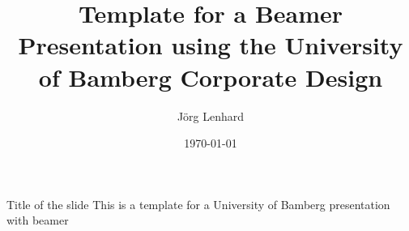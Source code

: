\documentclass{beamer}
\title[DSG Template]{Template for a Beamer Presentation using the University of Bamberg Corporate Design}
\author{J\"org Lenhard}
\institute{Distributed Systems Group - WIAI - University of Bamberg}
\date{\today}
\begin{document}
 \begin{frame}[plain]
	\titlepage
\end{frame}

\begin{frame}{Title of the slide}
This is a template for a University of Bamberg presentation with beamer
\end{frame}
\end{document}

